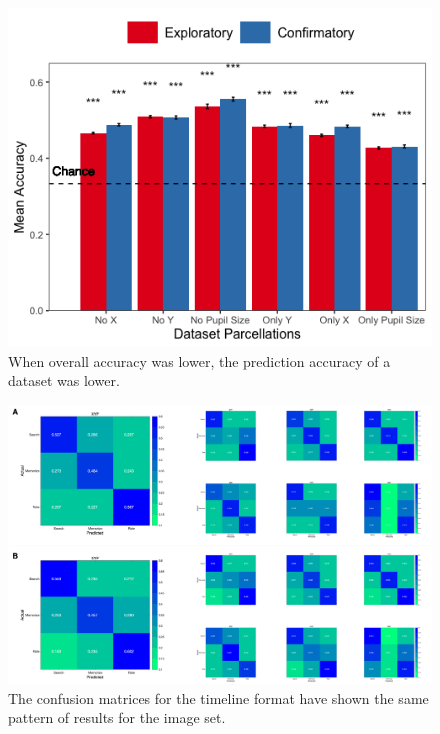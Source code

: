 \documentclass[
  english,
  man,floatsintext]{apa6}
\begin{document}
\begin{figure}
\centering
\includegraphics{results/r_code/timeline_parcellation_chance.png}
\caption{\label{fig:timeline-parcellation-chance}When overall accuracy was lower, the prediction accuracy of a dataset was lower.}
\end{figure}

\begin{figure}
\centering
\includegraphics{images/timeline_conf_matrices.png}
\caption{\label{fig:timeline-conf-matrices}The confusion matrices for the timeline format have shown the same pattern of results for the image set.}
\end{figure}
\end{document}
